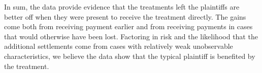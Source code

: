 \documentclass[11pt, a4paper]{article}
\begin{document}
  

In sum, the data provide evidence that the treatments left the plaintiffs are better off when they were present to receive the treatment directly. The gains come both from receiving payment earlier and from receiving payments in cases that would otherwise have been lost. Factoring in risk and the likelihood that the additional settlements come from cases with relatively weak unobservable characteristics, we believe the data show that the typical plaintiff is benefited by the treatment.  
\end{document}
